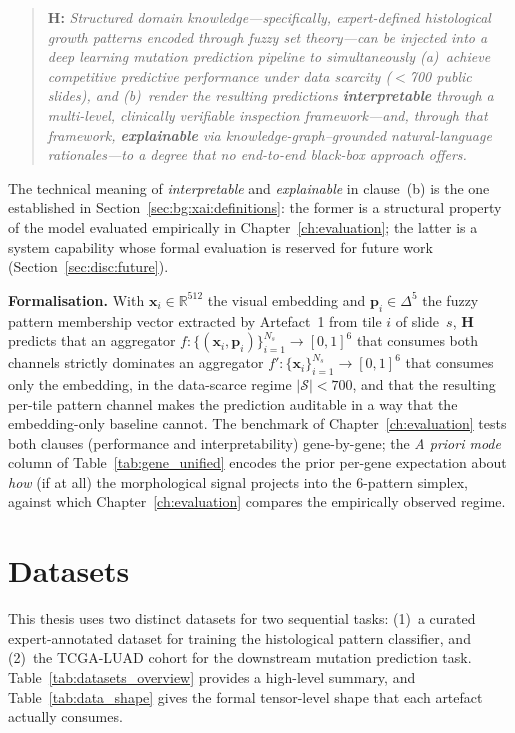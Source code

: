 \begin{quote}
\textbf{H:} \emph{Structured domain knowledge---specifically,
expert-defined histological growth patterns encoded through fuzzy set
theory---can be injected into a deep learning mutation prediction
pipeline to simultaneously
(a)~achieve competitive predictive performance under data scarcity
($<$700 public slides), and
(b)~render the resulting predictions \textbf{interpretable} through
a multi-level, clinically verifiable inspection framework---and,
through that framework, \textbf{explainable} via
knowledge-graph--grounded natural-language rationales---to a degree
that no end-to-end black-box approach offers.}
\end{quote}
The technical meaning of \emph{interpretable} and \emph{explainable}
in clause~(b) is the one established in
Section~\ref{sec:bg:xai:definitions}: the former is a structural
property of the model evaluated empirically in
Chapter~\ref{ch:evaluation}; the latter is a system capability whose
formal evaluation is reserved for future work
(Section~\ref{sec:disc:future}).

\textbf{Formalisation.}
With $\mathbf{x}_i \in \mathbb{R}^{512}$ the visual embedding and
$\mathbf{p}_i \in \Delta^5$ the fuzzy pattern membership vector
extracted by Artefact~1 from tile $i$ of slide~$s$, $\mathbf{H}$
predicts that an aggregator
$f: \{(\mathbf{x}_i, \mathbf{p}_i)\}_{i=1}^{N_s} \to [0,1]^6$
that consumes both channels strictly dominates an aggregator
$f': \{\mathbf{x}_i\}_{i=1}^{N_s} \to [0,1]^6$ that consumes only the
embedding, in the data-scarce regime $|\mathcal{S}| < 700$, and that
the resulting per-tile pattern channel makes the prediction auditable
in a way that the embedding-only baseline cannot.
The benchmark of Chapter~\ref{ch:evaluation} tests both clauses
(performance and interpretability) gene-by-gene; the
\emph{A priori mode} column of Table~\ref{tab:gene_unified} encodes
the prior per-gene expectation about \emph{how} (if at all) the
morphological signal projects into the 6-pattern simplex, against
which Chapter~\ref{ch:evaluation} compares the empirically observed
regime.


\section{Datasets}
\label{sec:uc:datasets}

This thesis uses two distinct datasets for two sequential tasks:
(1)~a curated expert-annotated dataset for training the histological
pattern classifier, and (2)~the TCGA-LUAD cohort for the downstream
mutation prediction task.
Table~\ref{tab:datasets_overview} provides a high-level summary, and
Table~\ref{tab:data_shape} gives the formal tensor-level shape that
each artefact actually consumes.

